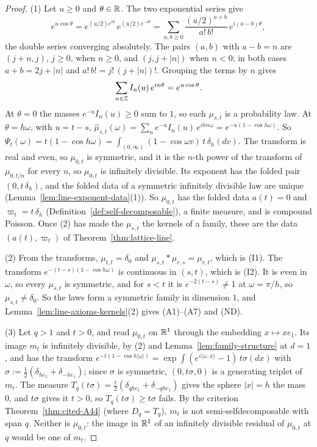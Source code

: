 \begin{proof}
\leanok
{}
(1) Let $u \ge 0$ and $\theta \in \mathbb{R}$. The two exponential series give
\[
  e^{u\cos\theta} = e^{(u/2)e^{i\theta}}\,e^{(u/2)e^{-i\theta}}
  = \sum_{a, b \ge 0}\frac{(u/2)^{a+b}}{a!\,b!}\,e^{i(a-b)\theta} ,
\]
the double series converging absolutely. The pairs $(a, b)$ with $a - b = n$ are
$(j + n, j)$, $j \ge 0$, when $n \ge 0$, and $(j, j + |n|)$ when $n < 0$; in both cases
$a + b = 2j + |n|$ and $a!\,b! = j!\,(j + |n|)!$. Grouping the terms by $n$ gives
\[
  \sum_{n \in \mathbb{Z}}I_n(u)\,e^{in\theta} = e^{u\cos\theta} .
\]
At $\theta = 0$ the masses $e^{-u}I_n(u) \ge 0$ sum to $1$, so each $\mu_{s,t}$ is a probability
law. At $\theta = h\omega$, with $u = t - s$,
$\widehat\mu_{s,t}(\omega) = \sum_n e^{-u}I_n(u)\,e^{ihn\omega} = e^{-u(1 - \cos h\omega)}$. So
$\Psi_t(\omega) = t(1 - \cos h\omega) = \int_{(0,\infty)}(1 - \cos\omega v)\,t\,\delta_h(dv)$.
The transform is real and even, so $\mu_{0,t}$ is symmetric, and it is the $n$-th power of the
transform of $\mu_{0,t/n}$ for every $n$, so $\mu_{0,t}$ is infinitely divisible. Its exponent has
the folded pair $(0, t\,\delta_h)$, and the folded data of a symmetric infinitely divisible law
are unique (Lemma~\ref{lem:line-exponent-data}(1)). So $\mu_{0,t}$ has the folded data
$a(t) = 0$ and $\varpi_t = t\,\delta_h$ (Definition~\ref{def:self-decomposable}), a
finite measure, and is compound Poisson. Once (2) has made the $\mu_{s,t}$ the kernels of a family,
these are the data $(a(t), \varpi_t)$ of Theorem~\ref{thm:lattice-line}.

(2) From the transforms, $\mu_{t,t} = \delta_0$ and $\mu_{s,t} * \mu_{r,s} = \mu_{r,t}$, which is
(I1). The transform $e^{-(t-s)(1 - \cos h\omega)}$ is continuous in $(s,t)$, which is (I2). It is
even in $\omega$, so every $\mu_{s,t}$ is symmetric, and for $s < t$ it is
$e^{-2(t-s)} \ne 1$ at $\omega = \pi/h$, so $\mu_{s,t} \ne \delta_0$. So the laws form a symmetric
family in dimension $1$, and Lemma~\ref{lem:line-axioms-kernels}(2) gives (A1)--(A7) and (ND).

(3) Let $q > 1$ and $t > 0$, and read $\mu_{0,t}$ on $\mathbb{R}^1$ through the embedding
$x \mapsto xe_1$. Its image $m_t$ is infinitely divisible, by (2) and
Lemma~\ref{lem:family-structure} at $d = 1$, and has the transform
$e^{-t(1 - \cos h|\omega|)} = \exp\int(e^{i\langle\omega, x\rangle} - 1)\,t\sigma(dx)$ with
$\sigma := \tfrac12(\delta_{he_1} + \delta_{-he_1})$; since $\sigma$ is symmetric,
$(0, t\sigma, 0)$ is a generating triplet of $m_t$. The measure
$T_q(t\sigma) = \tfrac{t}{2}(\delta_{qhe_1} + \delta_{-qhe_1})$ gives the sphere $|x| = h$ the mass
$0$, and $t\sigma$ gives it $t > 0$, so $T_q(t\sigma) \ge t\sigma$ fails. By the criterion
Theorem~\ref{thm:cited-A44} (where $D_q = T_q$), $m_t$ is
not semi-selfdecomposable with span $q$. Neither is $\mu_{0,t}$: the image in $\mathbb{R}^1$ of an
infinitely divisible residual of $\mu_{0,t}$ at $q$ would be one of $m_t$.


\end{proof}
